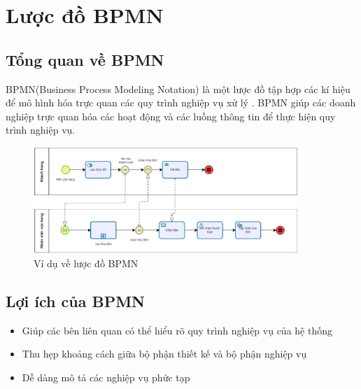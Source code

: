\section{Lược đồ BPMN}
\subsection{Tổng quan về BPMN}
\hspace*{0.5cm}BPMN(Business Process Modeling Notation) là một lược đồ tập hợp các kí hiệu để mô hình hóa trực quan các quy trình nghiệp vụ xử lý . BPMN giúp các doanh nghiệp trực quan hóa các hoạt động và các luồng thông tin để thực hiện quy trình nghiệp vụ.
\begin{figure}[!htp]
    \centering
    \includegraphics[width=10cm]{img/theory/BPMN/BPMN_sample.png}
    \newline
    \caption{Ví dụ về lược đồ BPMN}
\end{figure}
 
 
 
\subsection{Lợi ích của BPMN}
\begin{itemize}
    \item Giúp các bên liên quan có thể hiểu rõ quy trình nghiệp vụ của hệ thống
    \item Thu hẹp khoảng cách giữa bộ phận thiết kế và bộ phận nghiệp vụ
    \item Dễ dàng mô tả các nghiệp vụ phức tạp
\end{itemize}
 
